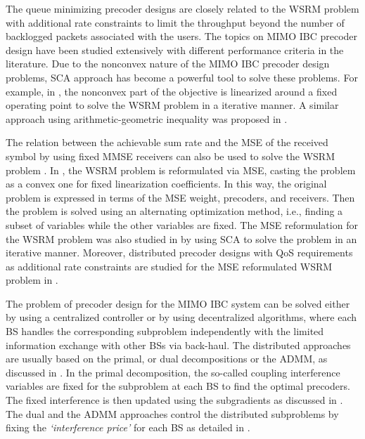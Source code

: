 The queue minimizing precoder designs are closely related to the \ac{WSRM} problem with additional rate constraints to limit the throughput beyond the number of backlogged packets associated with the users. The topics on \ac{MIMO} \ac{IBC} precoder design have been studied extensively with different performance criteria in the literature. Due to the nonconvex nature of the \ac{MIMO} \ac{IBC} precoder design problems, \ac{SCA} approach has become a powerful tool to solve these problems. For example, in \cite{sin_algorithm}, the nonconvex part of the objective is linearized around a fixed operating point to solve the \ac{WSRM} problem in a iterative manner. A similar approach using arithmetic-geometric inequality was proposed in \cite{tran2012fast}.

The relation between the achievable sum rate and the \ac{MSE} of the received symbol by using fixed \ac{MMSE} receivers can also be used to solve the \ac{WSRM} problem \cite{mse_duality}. In \cite{christensen2008weighted,wmmse_shi}, the \ac{WSRM} problem is reformulated via \ac{MSE}, casting the problem as a convex one for fixed linearization coefficients. In this way, the original problem is expressed in terms of the \ac{MSE} weight, precoders, and receivers. Then the problem is solved using an alternating optimization method, i.e., finding a subset of variables while the other variables are fixed. The \ac{MSE} reformulation for the \ac{WSRM} problem was also studied in \cite{hong2012decomposition} by using \ac{SCA} to solve the problem in an iterative manner. Moreover, distributed precoder designs with \ac{QoS} requirements as additional rate constraints are studied for the \ac{MSE} reformulated \ac{WSRM} problem in \cite{kaleva2013decentralized}.

The problem of precoder design for the \ac{MIMO} \ac{IBC} system can be solved either by using a centralized controller or by using decentralized algorithms, where each \ac{BS} handles the corresponding subproblem independently with the limited information exchange with other \acp{BS} via back-haul. The distributed approaches are usually based on the primal, or dual decompositions or the \ac{ADMM}, as discussed in \cite{palomar2006tutorial,boyd2011distributed}. In the  primal decomposition, the so-called coupling interference variables are fixed for the subproblem at each \ac{BS} to find the optimal precoders. The fixed interference is then updated using the subgradients as discussed in \cite{pennanen2011decentralized}. The dual and the \ac{ADMM} approaches control the distributed subproblems by fixing the \emph{`interference price'} for each \ac{BS} as detailed in \cite{tolli2011decentralized}.

